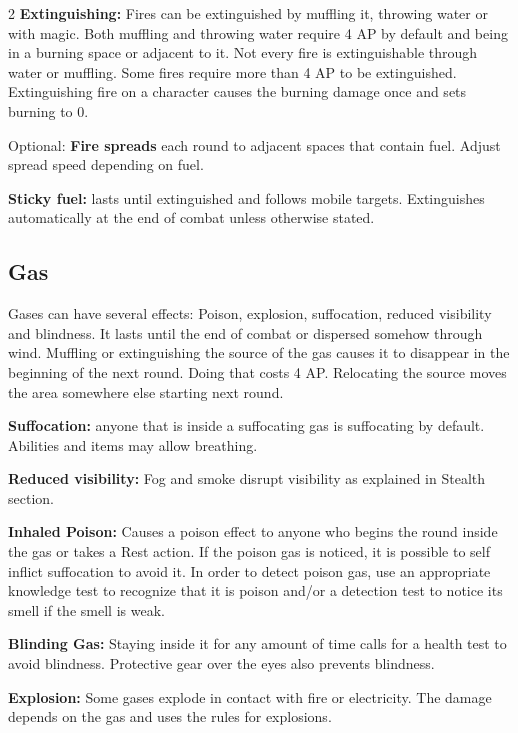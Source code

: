 \begin{multicols}{2}
\textbf{Extinguishing:} Fires can be extinguished by muffling it, throwing water or with magic. Both muffling and throwing water require 4 AP by default and being in a burning space or adjacent to it. Not every fire is extinguishable through water or muffling. Some fires require more than 4 AP to be extinguished. Extinguishing fire on a character causes the burning damage once and sets burning to 0.

Optional: \textbf{Fire spreads} each round to adjacent spaces that contain fuel. Adjust spread speed depending on fuel.

\textbf{Sticky fuel:} lasts until extinguished and follows mobile targets. Extinguishes automatically at the end of combat unless otherwise stated.

\subsection{Gas}

Gases can have several effects: Poison, explosion, suffocation, reduced visibility and blindness. It lasts until the end of combat or dispersed somehow through wind. Muffling or extinguishing the source of the gas causes it to disappear in the beginning of the next round. Doing that costs 4 AP. Relocating the source moves the area somewhere else starting next round.  

\begin{proplist}
    \item \textbf{Suffocation:} anyone that is inside a suffocating gas is suffocating by default. Abilities and items may allow breathing.
    \item \textbf{Reduced visibility:} Fog and smoke disrupt visibility as explained in Stealth section.
    \item \textbf{Inhaled Poison:} Causes a poison effect to anyone who begins the round inside the gas or takes a Rest action. If the poison gas is noticed, it is possible to self inflict suffocation to avoid it. In order to detect poison gas, use an appropriate knowledge test to recognize that it is poison and/or a detection test to notice its smell if the smell is weak.
    \item \textbf{Blinding Gas:} Staying inside it for any amount of time calls for a health test to avoid blindness. Protective gear over the eyes also prevents blindness.
    \item \textbf{Explosion:} Some gases explode in contact with fire or electricity. The damage depends on the gas and uses the rules for explosions.
\end{proplist}



\end{multicols}
